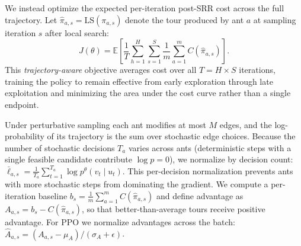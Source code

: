 \documentclass[sigconf]{acmart}
\begin{document}
We instead optimize the expected per-iteration post-SRR cost across the full trajectory.
Let $\hat{\pi}_{a,s} = \mathrm{LS}(\pi_{a,s})$ denote the tour produced by ant $a$ at sampling iteration $s$ after local search:
\begin{equation}
J(\theta) = \mathbb{E} \left[ \frac{1}{T} \sum_{h=1}^H \sum_{s=1}^S \frac{1}{m} \sum_{a=1}^m C(\hat{\pi}_{a,s}) \right].
\end{equation}
This \emph{trajectory-aware} objective averages cost over all $T = H \times S$ iterations, training the policy to remain effective from early exploration through late exploitation and minimizing the area under the cost curve rather than a single endpoint.

Under perturbative sampling each ant modifies at most $M$ edges, and the log-probability of its trajectory is the sum over stochastic edge choices.
Because the number of stochastic decisions $T_a$ varies across ants (deterministic steps with a single feasible candidate contribute $\log p = 0$), we normalize by decision count: $\bar{\ell}_{a,s} = \frac{1}{T_a} \sum_{t=1}^{T_a} \log p^\theta(v_t \mid u_t)$.
This per-decision normalization prevents ants with more stochastic steps from dominating the gradient.
We compute a per-iteration baseline $b_s = \frac{1}{m}\sum_{a=1}^{m} C(\hat{\pi}_{a,s})$ and define advantage as $A_{a,s} = b_s - C(\hat{\pi}_{a,s})$, so that better-than-average tours receive positive advantage.
For PPO we normalize advantages across the batch: $\hat{A}_{a,s} = (A_{a,s} - \mu_A) / (\sigma_A + \epsilon)$.
\end{document}

